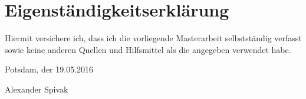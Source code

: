 \chapter*{Eigenst\"andigkeitserkl\"arung}

Hiermit versichere ich, dass ich die vorliegende Masterarbeit selbstst\"andig verfasst sowie keine anderen Quellen und Hilfsmittel als die angegeben verwendet habe.

\vspace*{1cm}

Potsdam, der 19.05.2016

\vspace*{2cm}

Alexander Spivak